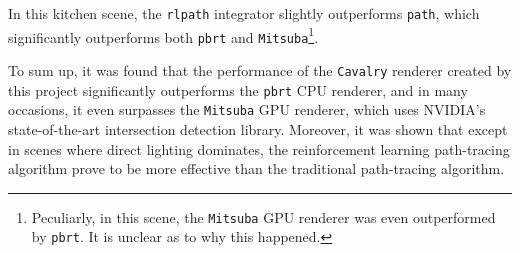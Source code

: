 In this kitchen scene, the \texttt{rlpath} integrator slightly outperforms \texttt{path}, which significantly outperforms both \texttt{pbrt} and \texttt{Mitsuba}\footnote{Peculiarly, in this scene, the \texttt{Mitsuba} GPU renderer was even outperformed by \texttt{pbrt}. It is unclear as to why this happened.}. 

\newpage

To sum up, it was found that the performance of the \texttt{Cavalry} renderer created by this project significantly outperforms the \texttt{pbrt} CPU renderer, and in many occasions, it even surpasses the \texttt{Mitsuba} GPU renderer, which uses NVIDIA's state-of-the-art intersection detection library. Moreover, it was shown that except in scenes where direct lighting dominates, the reinforcement learning path-tracing algorithm prove to be more effective than the traditional path-tracing algorithm.

